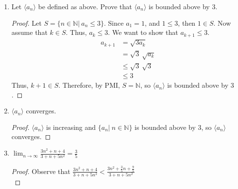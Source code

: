 \documentclass{article}
\theoremstyle{problem}
\theoremstyle{plain}
\theoremstyle{remark}
\newcommand{\abs}[1] {
  \left| #1 \right|
}
\begin{document}
\begin{enumerate}
\begin{proof}
\begin{align*}
  &< 3^{\frac{1}{2^n}} \cdot 3^{\frac{1}{2} + \frac{1}{4} + \ldots + \frac{1}{2^{n-1}}}\\
  &< 3^{\frac{1}{2} + \frac{1}{4} + \ldots + \frac{1}{2^{n-1}} + \frac{1}{2^n}}\\
  &< a_{n+1}
\end{align*}
Therefore, $\langle a_n \rangle$ is increasing, and thus,
bounded below by $1$.
\end{proof}
\item Let $\langle a_n \rangle$ be defined as above. Prove that $\langle a_n \rangle$ is bounded above by 3.
\begin{proof}
  Let $S = \{n \in \mathbb N|\ a_n \leq 3\}$. Since $a_1 = 1$, and $1 \leq 3$, then $1 \in S$. Now assume that $k \in S$. Thus, $a_k \leq 3$. We want to show that $a_{k+1} \leq 3$.
  \begin{align*}
    a_{k+1} &= \sqrt{3a_k}\\
    &= \sqrt{3}\ \sqrt{a_k}\\
    &\leq \sqrt{3}\ \sqrt{3}\\
    &\leq 3
  \end{align*}
Thus, $k+1 \in S$. Therefore, by PMI, $S = \mathbb N$, so $\langle a_n \rangle$ is bounded above by $3$.
\end{proof}
\item $\langle a_n \rangle$ converges.
\begin{proof}
  $\langle a_n \rangle$ is increasing and $\{a_n|\ n \in \mathbb N \}$ is bounded above by 3, so $\langle a_n \rangle$ converges.
\end{proof}
\item $\displaystyle \lim_{n \to \infty} \frac{3n^2+n+4}{3 + n + 5n^2} = \frac{3}{5}$
\begin{proof}
  Observe that $\displaystyle \frac{3n^2+n+4}{3 + n + 5n^2} < \frac{3n^2+\frac{3}{5}n+\frac{9}{5}}{3 + n + 5n^2}$\\[0.5cm]

\end{proof}
\end{enumerate}
\end{document}
